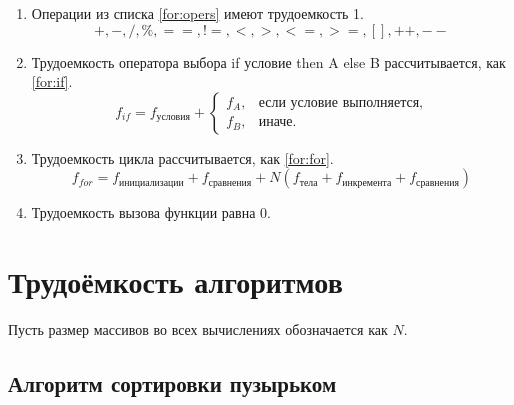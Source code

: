 \begin{enumerate}
    \item Операции из списка \eqref{for:opers} имеют трудоемкость 1.
    \begin{equation}
        \label{for:opers}
        +, -, /, \%, ==, !=, <, >, <=, >=, [], ++, {-}-
    \end{equation}
    \item Трудоемкость оператора выбора if условие then A else B рассчитывается, как \eqref{for:if}.
    \begin{equation}
        \label{for:if}
        f_{if} = f_{\text{условия}} +
        \begin{cases}
            f_A, & \text{если условие выполняется,}\\
            f_B, & \text{иначе.}
        \end{cases}
    \end{equation}
    \item Трудоемкость цикла рассчитывается, как \eqref{for:for}.
    \begin{equation}
        \label{for:for}
        f_{for} = f_{\text{инициализации}} + f_{\text{сравнения}} + N(f_{\text{тела}} + f_{\text{инкремента}} + f_{\text{сравнения}})
    \end{equation}
    \item Трудоемкость вызова функции равна 0.
\end{enumerate}

\section{Трудоёмкость алгоритмов}

Пусть размер массивов во всех вычислениях обозначается как $N$.

\subsection{Алгоритм сортировки пузырьком}

